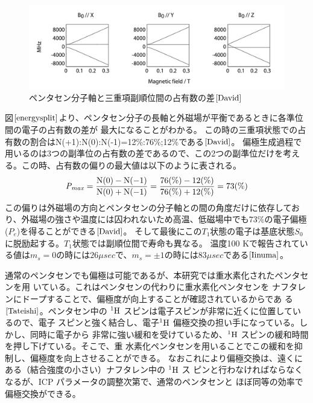  \begin{figure}[ht]
  \centering
  \includegraphics[keepaspectratio, scale=0.5]
       {./chap2/fig/energysplit_B0.png}
  \caption{ペンタセン分子軸と三重項副順位間の占有数の差$\cite{David}$}
  \label{energysplit}
 \end{figure}

 図$\ref{energysplit}$より、ペンタセン分子の長軸と外磁場が平衡であるときに各準位間の電子の占有数の差が
 最大になることがわかる。
 この時の三重項状態での占有数の割合はN(+1):N(0):N(-1)=12\%:76\%;12\%である$\cite{David}$。
偏極生成過程で用いるのは3つの副準位の占有数の差であるので、この2つの副準位だけを考える。この時、占有数の偏りの最大値は以下のように表される。
\begin{equation}
  \it P_{max}=\frac{\rm{N}(0)-\rm{N}(-1)}{\rm{N}(0)+\rm{N}(-1)}=\frac{\rm{76}(\%)-\rm{12}(\%)}{\rm{76}(\%)+\rm{12}(\%)}=\rm{73}(\%)
  \label{pentacene_P}
\end{equation}
この偏りは外磁場の方向とペンタセンの分子軸との間の角度だけに依存しており、外磁場の強さや温度には囚われないため高温、低磁場中でも$73\%$の電子偏極($P_e$)を得ることができる$\cite{David}$。
そして最後にこの$T_1$状態の電子は基底状態$S_0$に脱励起する。$T_1$状態では副順位間で寿命も異なる。
温度100 Kで報告されている値は$m_s=0$の時には$26 \mu sec$で、$m_s=\pm 1$の時には$83 \mu sec$である$\cite{Iinuma}$。

通常のペンタセンでも偏極は可能であるが、本研究では重水素化されたペンタセンを用
いている。これはペンタセンの代わりに重水素化ペンタセンを
ナフタレンにドープすることで、偏極度が向上することが確認されているからであ
る$\cite{Tateishi}$。ペンタセン中の ${}^1\rm{H}$ スピンは電子スピンが非常に近くに位置しているので、電子
スピンと強く結合し、電子${}^1\rm{H}$ 偏極交換の担い手になっている。しかし、同時に電子から
非常に強い緩和を受けているため、${}^1\rm{H}$ スピンの緩和時間を押し下げている。そこで、重
水素化ペンタセンを用いることでこの緩和を抑制し、偏極度を向上させることができる。
なおこれにより偏極交換は、遠くにある（結合強度の小さい）ナフタレン中の ${}^1\rm{H}$ ス
ピンと行わなければならなくなるが、ICP パラメータの調整次第で、通常のペンタセンと
ほぼ同等の効率で偏極交換ができる。

